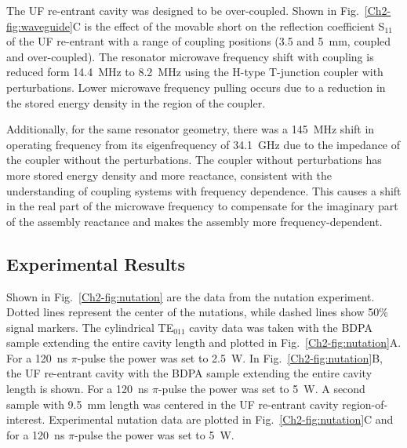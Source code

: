 The UF re-entrant \cylTE{} cavity was designed to be over-coupled. Shown in Fig.~\ref{Ch2-fig:waveguide}C is the effect of the movable short on the reflection coefficient S$_{\text{11}}$ of the UF re-entrant \cylTE{} with a range of coupling positions (3.5 and 5~mm, coupled and over-coupled). The resonator microwave frequency shift with coupling is reduced form 14.4~MHz to 8.2~MHz using the H-type T-junction coupler with perturbations. Lower microwave frequency pulling occurs due to a reduction in the stored energy density in the region of the coupler. 

Additionally, for the same resonator geometry, there was a 145~MHz shift in operating frequency from its eigenfrequency of 34.1~GHz due to the impedance of the coupler without the perturbations. The coupler without perturbations has more stored energy density and more reactance, consistent with the understanding of coupling systems with frequency dependence. \cite{Mett2009} This causes a shift in the real part of the microwave frequency to compensate for the imaginary part of the assembly reactance and makes the assembly more frequency-dependent. 

\subsection{Experimental Results}
Shown in Fig.~\ref{Ch2-fig:nutation} are the data from the nutation experiment. Dotted lines represent the center of the nutations, while dashed lines show 50\% signal markers. The cylindrical TE$_{011}$ cavity data was taken with the BDPA sample extending the entire cavity length and plotted in Fig.~\ref{Ch2-fig:nutation}A. For a 120~ns $\pi$-pulse the power was set to 2.5~W. In Fig.~\ref{Ch2-fig:nutation}B, the UF re-entrant \cylTE{} cavity with the BDPA sample extending the entire cavity length is shown. For a 120~ns $\pi$-pulse the power was set to 5~W. A second sample with 9.5~mm length was centered in the UF re-entrant \cylTE{} cavity region-of-interest. Experimental nutation data are plotted in Fig.~\ref{Ch2-fig:nutation}C and for a 120~ns $\pi$-pulse the power was set to 5~W.

